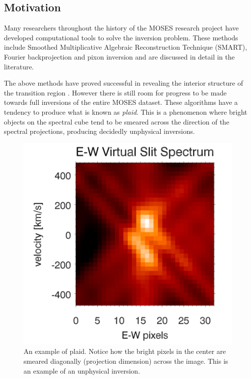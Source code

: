 \documentclass[twoside]{article}
\begin{document}
\begin{multicols}{2}
\section{Motivation}

Many researchers throughout the history of the MOSES research project have developed computational tools to solve the inversion problem. These methods include Smoothed Multiplicative Algebraic Reconstruction Technique (SMART)\cite{smart}, Fourier backprojection and pixon inversion \cite{inversion} and are discussed in detail in the literature. 
\par The above methods have proved successful in revealing the interior structure of the transition region \cite{moses}. However there is still room for progress to be made towards full inversions of the entire MOSES dataset. These algorithms have a tendency to produce what is known as \textit{plaid}. This is a phenomenon where bright objects on the spectral cube tend to be smeared across the direction of the spectral projections, producing decidedly unphysical inversions.

\begin{figure}[H]
	\includegraphics[width=\linewidth]{images/plaid2}
	\caption{An example of plaid. Notice how the bright pixels in the center are smeared diagonally (projection dimension) across the image. This is an example of an unphysical inversion. \cite{tom} }
\end{figure} 


\end{multicols}
\end{document}
